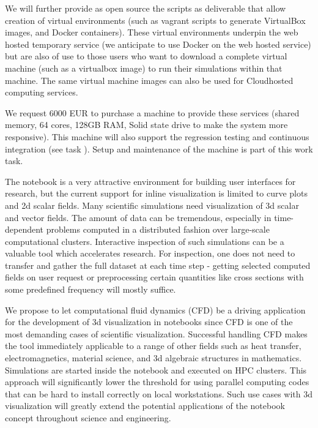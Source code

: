 \begin{workpackage}
\begin{tasklist}
\begin{task}[lead=USO,id=oommf-nb-ve,title=\OOMMFNB{} online and downloadable virtual environments,PM=3]
  We will further provide as open source the scripts as deliverable
   that allow
  creation of virtual environments (such as vagrant scripts to
  generate VirtualBox \cite{Virtualbox} images, and Docker
  \cite{Docker} containers). These virtual environments underpin the
  web hosted temporary \OOMMFNB{} service (we anticipate to use Docker
  on the web hosted service) but are also of use to those users who
  want to download a complete virtual machine (such as a virtualbox
  image) to run their simulations within that machine. The same
  virtual machine images can also be used for Cloudhosted computing services.

  We request 6000 EUR to purchase a machine to provide these
  services (shared memory, 64 cores, 128GB RAM, Solid state drive
  to make the system more responsive). This machine will also support
  the regression testing and continuous integration (see task
  ). Setup and
  maintenance of the machine is part of this work task.
\end{task}


\begin{task}[title=Visualization system for 3d data in web-notebook
, id=cfd-vis]

The \Jupyter notebook is a very attractive environment for building
user interfaces for research, but the current support for inline
visualization is limited to curve plots and 2d scalar fields.  Many
scientific simulations need visualization of 3d scalar and vector
fields.  The amount of data can be tremendous, especially in
time-dependent problems computed in a distributed fashion over
large-scale computational clusters. Interactive inspection of such
simulations can be a valuable tool which accelerates research. For
inspection, one does not need to transfer and gather the full dataset
at each time step - getting selected computed fields on user request
or preprocessing certain quantities like cross sections with some
predefined frequency will mostly suffice.

We propose to let computational fluid dynamics (CFD) be a driving
application for the development of 3d visualization in \Jupyter
notebooks since CFD is one of the most demanding cases of scientific
visualization. Successful handling CFD makes the tool immediately
applicable to a range of other fields such as heat transfer,
electromagnetics, material science, and 3d algebraic structures in
mathematics. Simulations are started inside the notebook and executed
on HPC clusters. This approach will significantly lower the threshold
for using parallel computing codes that can be hard to install
correctly on local workstations. Such use cases with 3d visualization
will greatly extend the potential applications of the \Jupyter
notebook concept throughout science and engineering.


\end{task}
\end{tasklist}
\end{workpackage}
